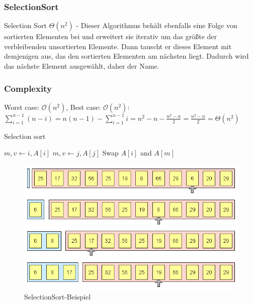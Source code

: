 \documentclass[a4paper]{article}
\begin{document}
\newpage
  \subsubsection{SelectionSort}\label{Selectionsort}
   Selection Sort $\Theta(n^2)$ - Dieser Algorithmus behält ebenfalls eine Folge von sortierten Elementen bei und erweitert sie iterativ um das größte der verbleibenden unsortierten Elemente. Dann tauscht er dieses Element mit demjenigen aus, das den sortierten Elementen am nächsten liegt. Dadurch wird das nächste Element ausgewählt, daher der Name.
 
 \subsubsection*{Complexity}
    Worst case: $\mathcal{O}(n^2)$, Best case: $\mathcal{O}(n^2)$: \\
    $\sum_{i=1}^{n-1} (n-i) = n(n-1)-\sum_{i=1}^{n-1} i = n^2 - n - \frac{n^2-n}{2} = \frac{n^2-n}{2} = \Theta(n^2)$
    

    \begin{algorithm}[h]
        \caption{Selection sort}
        \label{alg:SelectionSort}
        \begin{algorithmic} 
          \State $m, v \gets i, A\left[i\right]$
          \State $m, v \gets j, A\left[j\right]$
          \EndIf
          \EndFor
          \State Swap $A\left[i\right]$ and $A\left[m\right]$
          \EndIf
        
          \EndFor
        \end{algorithmic}
    \end{algorithm}
    
    \begin{figure}[h]
        \centering
        \includegraphics[scale=0.3]{Pictures/selectionsort_idee_version1.png}
        \caption{SelectionSort-Beispiel}
        \label{fig:SelectionSort}
    \end{figure}
\end{document}
